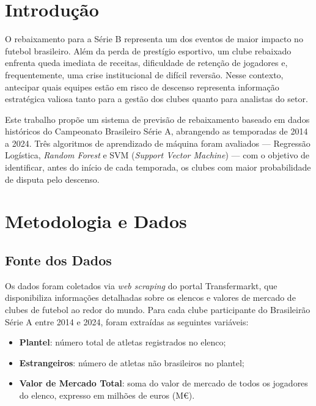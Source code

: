 
\section{Introdução}

O rebaixamento para a Série B representa um dos eventos de maior impacto no futebol brasileiro.
Além da perda de prestígio esportivo, um clube rebaixado enfrenta queda imediata de receitas,
dificuldade de retenção de jogadores e, frequentemente, uma crise institucional de difícil reversão.
Nesse contexto, antecipar quais equipes estão em risco de descenso representa informação
estratégica valiosa tanto para a gestão dos clubes quanto para analistas do setor.

Este trabalho propõe um sistema de previsão de rebaixamento baseado em dados históricos do
Campeonato Brasileiro Série A, abrangendo as temporadas de 2014 a 2024.
Três algoritmos de aprendizado de máquina foram avaliados — Regressão Logística,
\textit{Random Forest} e SVM (\textit{Support Vector Machine}) — com o objetivo de identificar,
antes do início de cada temporada, os clubes com maior probabilidade de disputa pelo descenso.


\section{Metodologia e Dados}

\subsection{Fonte dos Dados}

Os dados foram coletados via \textit{web scraping} do portal Transfermarkt,
que disponibiliza informações detalhadas sobre os elencos e valores de mercado
de clubes de futebol ao redor do mundo.
Para cada clube participante do Brasileirão Série A entre 2014 e 2024,
foram extraídas as seguintes variáveis:

\begin{itemize}
    \item \textbf{Plantel}: número total de atletas registrados no elenco;
    \item \textbf{Estrangeiros}: número de atletas não brasileiros no plantel;
    \item \textbf{Valor de Mercado Total}: soma do valor de mercado de todos os
          jogadores do elenco, expresso em milhões de euros (M\euro{}).
\end{itemize}

